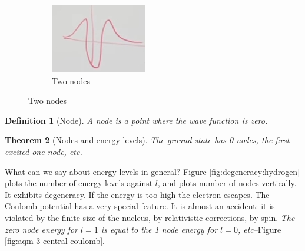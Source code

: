 \documentclass[]{article}
\newtheorem{thm}{Theorem}
\newtheorem{defn}[thm]{Definition}
\begin{document}
\begin{figure}[H]
\begin{subfigure}[t]{0.45\textwidth}
	\end{subfigure}
	\begin{subfigure}[t]{0.45\textwidth}
		\caption{Two nodes}\label{fig:aqm-3-central-2nodes}
		\includegraphics[width=\textwidth]{aqm-3-central-2node2}
	\end{subfigure}
\end{figure}

\begin{defn}[Node]\label{defn:node}
	A node is a point where the wave function is zero.
\end{defn}

\begin{thm}[Nodes and energy levels]
	The ground state has 0 nodes, the first excited one node, etc.
\end{thm}

What can we say about energy levels in general? Figure \ref{fig:degeneracy:hydrogen} plots the number of energy levels against $l$, and plots number of nodes vertically. It exhibits degeneracy. If the energy is too high the electron escapes. The Coulomb potential has a very special feature. It is almost an accident: it is violated by the finite size of the nucleus, by relativistic corrections, by spin. \emph{The zero node energy for $l=1$ is equal to the 1 node energy for $l=0$, etc}--Figure \ref{fig:aqm-3-central-coulomb}.
\end{document}
